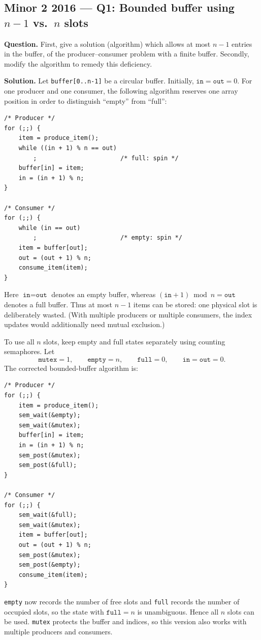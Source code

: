 \documentclass[11pt,a4paper]{article}
\begin{document}
\subsection*{Minor 2 2016 --- Q1: Bounded buffer using \(n-1\) vs.\ \(n\) slots}
\textbf{Question.}
First, give a solution (algorithm) which allows at most \(n-1\) entries in
the buffer, of the producer--consumer problem with a finite buffer.
Secondly, modify the algorithm to remedy this deficiency.

\textbf{Solution.}
Let \texttt{buffer[0..n-1]} be a circular buffer.  Initially,
\(\texttt{in}=\texttt{out}=0\).  For one producer and one consumer, the
following algorithm reserves one array position in order to distinguish
``empty'' from ``full'':

\begin{verbatim}
/* Producer */
for (;;) {
    item = produce_item();
    while ((in + 1) % n == out)
        ;                       /* full: spin */
    buffer[in] = item;
    in = (in + 1) % n;
}

/* Consumer */
for (;;) {
    while (in == out)
        ;                       /* empty: spin */
    item = buffer[out];
    out = (out + 1) % n;
    consume_item(item);
}
\end{verbatim}

Here \(\texttt{in}=\texttt{out}\) denotes an empty buffer, whereas
\((\texttt{in}+1)\bmod n=\texttt{out}\) denotes a full buffer.  Thus at
most \(n-1\) items can be stored: one physical slot is deliberately
wasted.  (With multiple producers or multiple consumers, the index
updates would additionally need mutual exclusion.)

To use all \(n\) slots, keep empty and full states separately using
counting semaphores.  Let
\[
  \texttt{mutex}=1,\qquad \texttt{empty}=n,\qquad \texttt{full}=0,
  \qquad \texttt{in}=\texttt{out}=0.
\]
The corrected bounded-buffer algorithm is:

\begin{verbatim}
/* Producer */
for (;;) {
    item = produce_item();
    sem_wait(&empty);
    sem_wait(&mutex);
    buffer[in] = item;
    in = (in + 1) % n;
    sem_post(&mutex);
    sem_post(&full);
}

/* Consumer */
for (;;) {
    sem_wait(&full);
    sem_wait(&mutex);
    item = buffer[out];
    out = (out + 1) % n;
    sem_post(&mutex);
    sem_post(&empty);
    consume_item(item);
}
\end{verbatim}

\texttt{empty} now records the number of free slots and \texttt{full}
records the number of occupied slots, so the state with
\(\texttt{full}=n\) is unambiguous.  Hence all \(n\) slots can be used.
\texttt{mutex} protects the buffer and indices, so this version also
works with multiple producers and consumers.
\end{document}
